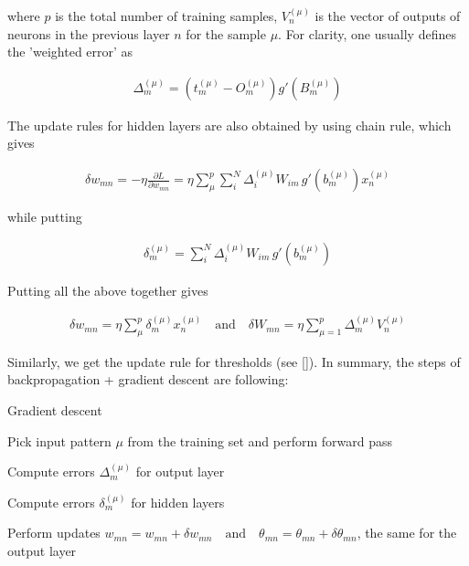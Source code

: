 \noindent where $ p $ is the total number of training samples, $ V_{n}^{(\mu)} $ is the vector of outputs of neurons in the previous layer $ n $ for the sample $ \mu $. For clarity, one usually defines the 'weighted error' as

\begin{gather}
	\Delta_{m}^{(\mu)} = (t_{m}^{(\mu)} - O_{m}^{(\mu)})   g'(B_{m}^{(\mu)})
\end{gather}

\noindent The update rules for hidden layers are also obtained by using chain rule, which gives

\begin{gather}
\delta w_{mn} = - \eta \frac{\partial L}{\partial w_{mn}} = \eta \sum\limits_{\mu}^{p} \sum\limits_{i}^{N}
\Delta_{i}^{(\mu)} W_{im} \, g'(b_{m}^{(\mu)}) x_{n}^{(\mu)}
\end{gather}

\noindent while putting

\begin{gather}
\delta_{m}^{(\mu)} = \sum\limits_{i}^{N} \Delta_{i}^{(\mu)} W_{im} \, g'(b_{m}^{(\mu)})
\end{gather}


\noindent Putting all the above together gives

\begin{gather}
\delta w_{mn} = \eta \sum\limits_{\mu}^{p} \delta_{m}^{(\mu)} x_{n}^{(\mu)}
\quad \text{and} \quad 
\delta W_{mn} = \eta \sum\limits_{\mu=1}^{p} \Delta_{m}^{(\mu)} V_{n}^{(\mu)}	
\end{gather}

\noindent Similarly, we get the update rule for thresholds (see []). In summary, the steps of backpropagation + gradient descent are following:
\begin{algorithm}
	\caption{Gradient descent}
	\begin{algorithmic}[1]
		\item Pick input pattern $ \mu $ from the training set and perform forward pass
		\item Compute errors $ \Delta_{m}^{(\mu)} $ for output layer
		\item Compute errors $ \delta_{m}^{(\mu)} $ for hidden layers
		\item Perform updates $w_{mn} = w_{mn} + \delta w_{mn} \quad \text{and} \quad \theta_{mn} = \theta_{mn} + \delta \theta_{mn}$, the same for the output layer
	\end{algorithmic}
\end{algorithm}

